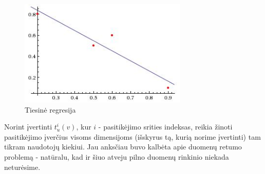 \documentclass{VUMIFInfMagistrinis}
\begin{document}
\begin{figure}[ht!]
	\centering
	\includegraphics[width=80mm]{linreg.jpg}
	\caption{Tiesinė regresija} \label{linreg}
\end{figure}
Norint įvertinti $t_{u}^i(v)$, kur $i$ - pasitikėjimo srities indeksas, reikia žinoti pasitikėjimo įverčius visoms dimensijoms (išskyrus tą, kurią norime įvertinti) tam tikram naudotojų kiekiui. Jau anksčiau buvo kalbėta apie duomenų retumo problemą - natūralu, kad ir šiuo atveju pilno duomenų rinkinio niekada neturėsime.
\end{document}
